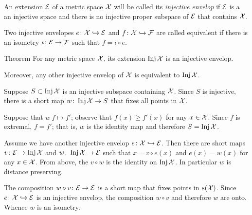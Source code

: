An extension $\mathcal{E}$ of a metric space $\mathcal{X}$ will be called its \emph{injective envelop} if $\mathcal{E}$ is a an injective space and there is no injective proper subspace of $\mathcal{E}$ that contains $\mathcal{X}$.

Two injective envelopes $e\colon\mathcal{X}\hookrightarrow \mathcal{E}$ and $f\colon\mathcal{X}\hookrightarrow \mathcal{F}$ are called  equivalent if there is an isometry $\iota\colon \mathcal{E}\to\mathcal{F}$ such that $f=\iota\circ e$.

\begin{thm}{Theorem}
For any metric space $\mathcal{X}$, its extension $\mathop{\rm Inj}\nolimits\mathcal{X}$ is an injective envelop.

Moreover, any other injective envelop of $\mathcal{X}$ is equivalent to $\mathop{\rm Inj}\nolimits\mathcal{X}$.
\end{thm}

Suppose $S\subset \mathop{\rm Inj}\nolimits\mathcal{X}$ is an injective subspace containing $\mathcal{X}$.
Since $S$ is injective, there is a short map $w\colon\mathop{\rm Inj}\nolimits\mathcal{X}\to S$ that fixes all points in $\mathcal{X}$.

Suppose that $w\:f\mapsto f'$; observe that $f(x)\ge f'(x)$ for any $x\in \mathcal{X}$.
Since $f$ is extremal, $f=f'$;
that is, $w$ is the identity map and therefore $S=\mathop{\rm Inj}\nolimits\mathcal{X}$.

Assume we have another injective envelop $e\colon\mathcal{X}\hookrightarrow \mathcal{E}$.
Then there are short maps $v\colon\mathcal{E}\to \mathop{\rm Inj}\nolimits\mathcal{X}$ and $w\colon\mathop{\rm Inj}\nolimits\mathcal{X}\to \mathcal{E}$ such that $x=v\circ e(x)$ and $e(x)=w(x)$ for any $x\in\mathcal{X}$.
From above, the $v\circ w$ is the identity on $\mathop{\rm Inj}\nolimits\mathcal{X}$.
In particular $w$ is distance preserving.

The composition $w\circ v\colon\mathcal{E}\to \mathcal{E}$ is a short map that fixes points in $e(\mathcal{X})$.
Since $e\colon\mathcal{X}\hookrightarrow \mathcal{E}$ is an injective envelop, the composition $w\circ v$ and therefore $w$ are onto.
Whence $w$ is an isometry.
\qeds




